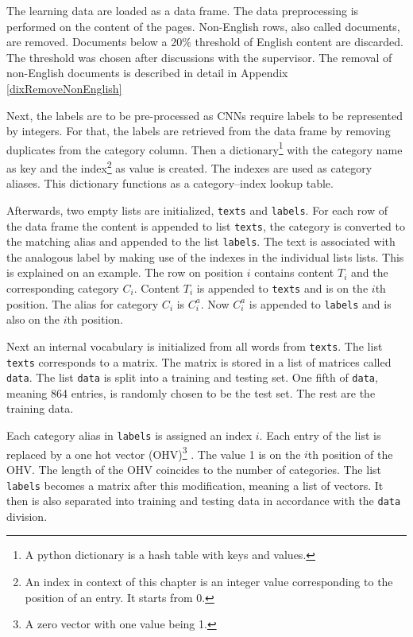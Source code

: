The learning data are loaded as a data frame. The data preprocessing is performed on the content of the pages. Non-English rows, also called documents, are removed. Documents below a 20\%  threshold of English content are discarded. The threshold was chosen after discussions with the supervisor. The removal of non-English documents is described in detail in Appendix \ref{dixRemoveNonEnglish} 

Next, the labels are to be pre-processed as CNNs require labels to be represented by integers. For that, the labels are retrieved from the data frame by removing duplicates from the category column. Then a dictionary\footnote{A python dictionary is a hash table with keys and values.} with the category name as key and the index\footnote{An index in context of this chapter is an integer value corresponding to the position of an entry. It starts from 0.} as value is created. The indexes are used as category aliases. This dictionary functions as a category--index lookup table.

Afterwards, two empty lists are initialized, \texttt{texts} and \texttt{labels}. For each row of the data frame the content is appended to list \texttt{texts}, the category is converted to the matching alias and appended to the list \texttt{labels}. The text is associated with the analogous label by making use of the indexes in the individual lists lists.  This is explained on an example. The row on position $i$ contains content $T_i$ and the corresponding category $C_i$. Content $T_i$ is appended to \texttt{texts} and is on the $i$th position. The alias for category $C_i$ is $C^a_i$. Now $C^a_i$ is appended to \texttt{labels} and is also on the $i$th position.

Next an internal vocabulary is initialized from all words from \texttt{texts}. The list \texttt{texts} corresponds to a matrix. The matrix is stored in a list of matrices called \texttt{data}. The list \texttt{data} is split into a training and testing set. One fifth of \texttt{data}, meaning 864 entries, is randomly chosen to be the test set. The rest are the training data. 

Each category alias in \texttt{labels} is assigned an index $i$. Each entry of the list is replaced by a one hot vector (OHV)\footnote{A zero vector with one value being 1.} . The value 1 is on the $i$th position of the OHV. The length of the OHV coincides to the number of categories. The list \texttt{labels} becomes a matrix after this modification, meaning a list of vectors. It then is also separated into training and testing data in accordance with the \texttt{data} division.

